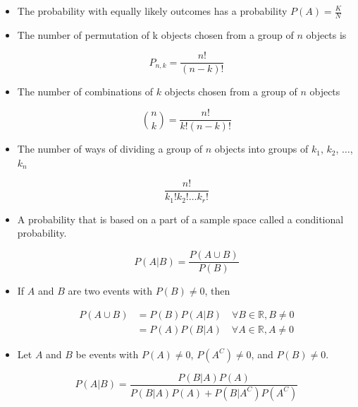 \documentclass[9pt,landscape]{memoir}
\begin{document}
\begin{multicols}{3}
\begin{itemize}
    \item The probability with equally likely outcomes has a probability $P(A) = \frac{K}{N}$
    \item The number of permutation of k objects chosen from a group of $n$ objects is

        \begin{equation*}
            P_{n,k} = \frac{n!}{(n - k)!}
        \end{equation*}

    \item The number of combinations of $k$ objects chosen from a group of $n$ objects

        \begin{equation*}
            {n \choose k} = \frac{n!}{k!(n - k)!}
        \end{equation*}

    \item The number of ways of dividing a group of $n$ objects into groups of $k_1$, $k_2$, $\ldots$, $k_n$

        \begin{equation*}
            \frac{n!}{k_1! k_2! \ldots k_r!}
        \end{equation*}

    \item A probability that is based on a part of a sample space called a conditional probability.

        \begin{equation*}
            P(A|B) = \frac{P(A \cup B)}{P(B)}
        \end{equation*}

    \item If $A$ and $B$ are two events with $P(B) \neq 0$, then

        \begin{align*}
            P(A \cup B) &= P(B)P(A|B) \quad \forall B \in\mathbb{R}, B \neq 0\\
                        &= P(A)P(B|A) \quad \forall A \in\mathbb{R}, A \neq 0
        \end{align*}

    \item Let $A$ and $B$ be events with $P(A) \neq 0$, $P(A^C) \neq 0$, and $P(B) \neq 0$.

        \begin{equation*}
            P(A|B) = \frac{P(B|A)P(A)}{P(B|A)P(A) + P(B|A^C)P(A^C)}
        \end{equation*}


\end{itemize}
\end{multicols}
\end{document}
